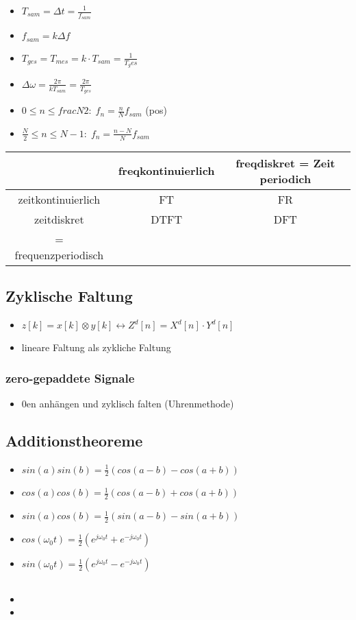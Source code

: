 \documentclass{article}
\begin{document}
\begin{itemize}
\item $T_{sam} = \Delta t = \frac{1}{f_{sam}}$
\item $f_{sam} = k \Delta f$
\item $T_{ges} = T_{mes} = k\cdot T_{sam} = \frac{1}{T_ges}$
\item $\Delta \omega = \frac{2\pi}{k T_{sam}} = \frac{2\pi}{T_{ges}}$
\item $0 \leq n \leq frac{N}{2}: \; f_n = \frac{n}{N} f_{sam}$ (pos)
\item $\frac{N}{2} \leq n \leq N-1:\; f_n= \frac{n-N}{N} f_{sam} $
\end{itemize}



 \begin{tabular}{c |c| c}
  & freqkontinuierlich & freqdiskret = Zeit periodich\\ \hline
  zeitkontinuierlich & FT & FR \\ \hline
 zeitdiskret &DTFT & DFT \\
 = frequenzperiodisch  & \\
 \end{tabular}

\subsection{Zyklische Faltung}
\begin{itemize}
\item $z[k] = x[k]\otimes y[k] \leftrightarrow Z^d[n] = X^d[n]\cdot Y^d[n]$
\item lineare Faltung als zykliche Faltung
\end{itemize}

\subsubsection{zero-gepaddete Signale}
\begin{itemize}
\item 0en anhängen und zyklisch falten (Uhrenmethode)

\end{itemize}

\subsection{Additionstheoreme}
\begin{itemize}
\item $sin(a)sin(b)=\frac{1}{2} (cos(a-b)-cos(a+b))$
\item $cos(a)cos(b)=\frac{1}{2} (cos(a-b)+cos(a+b))$
\item $sin(a)cos(b)=\frac{1}{2} (sin(a-b)-sin(a+b))$
\item $cos(\omega_0 t) = \frac{1}{2}(e^{j\omega_0 t}+e^{-j\omega_0 t })$
\item $sin(\omega_0 t) = \frac{1}{2}(e^{j\omega_0 t}-e^{-j\omega_0 t })$
\end{itemize}


\subsection{}
\begin{itemize}
\item
\item
\end{itemize}
\end{document}
